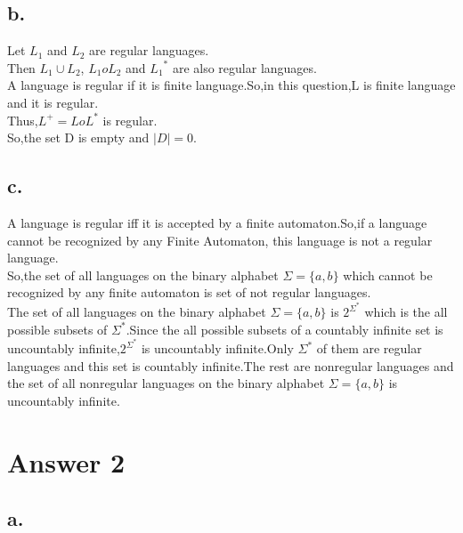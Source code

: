 \documentclass[12pt]{article}
\begin{document}
\subsection*{b.}

Let $L_1$ and $L_2$ are regular languages.\\
Then $L_1 \cup L_2$, $L_1 o L_2$ and ${L_1}^*$ are also regular languages.\\ 
A language is regular if it is finite language.So,in this question,L is finite language and it is regular.\\
Thus,$L^+ = L o L^*$ is regular.\\
So,the set D is empty and $|D|= 0$.


\subsection*{c.}

A language is regular iff it is accepted by a finite automaton.So,if a language cannot be recognized by any Finite Automaton, this language is not a regular language.\\

So,the set of all languages on the binary alphabet $\Sigma = \{a,b\} $ which cannot be recognized by any finite automaton is set of not regular languages.\\ 
 
The set of all languages on the binary alphabet $\Sigma = \{a,b\} $ is $2^{\Sigma^*} $ which is the all possible subsets of $\Sigma^*$.Since the all possible subsets of a countably infinite set is uncountably infinite,$2^{\Sigma^*} $ is uncountably infinite.Only $\Sigma^*$ of them are regular languages and this set is countably infinite.The rest are nonregular languages and the set of all nonregular languages on the binary alphabet $\Sigma = \{a,b\} $ is uncountably infinite.

\section*{Answer 2}

\subsection*{a.}
\end{document}

